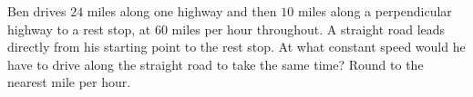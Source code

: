 Ben drives $24$ miles along one highway and then $10$ miles along a perpendicular highway to a rest stop, at $60$ miles per hour throughout. A straight road leads directly from his starting point to the rest stop. At what constant speed would he have to drive along the straight road to take the same time? Round to the nearest mile per hour.
